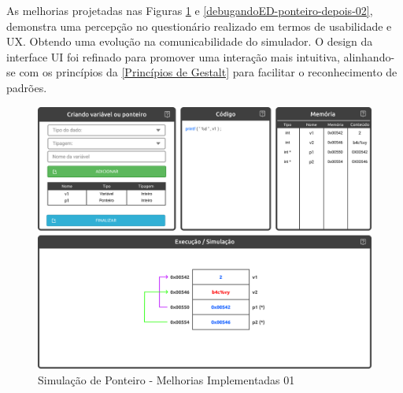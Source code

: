 As melhorias projetadas nas Figuras \ref{debugandoED-ponteiro-depois-01} e \ref{debugandoED-ponteiro-depois-02}, demonstra uma percepção no questionário realizado em termos de usabilidade e \ac{UX}. Obtendo uma evolução na comunicabilidade do simulador. O design da interface \ac{UI} foi refinado para promover uma interação mais intuitiva, alinhando-se com os princípios da \autoref{Princípios de Gestalt} para facilitar o reconhecimento de padrões.

\begin{figure}[htb]
    \begin{center}
        \includegraphics[scale=0.25]{figs/debugandoED-ponteiro-depois-01.png}
    \end{center}
    \caption{\label{debugandoED-ponteiro-depois-01}Simulação de Ponteiro - Melhorias Implementadas 01}
\end{figure}

